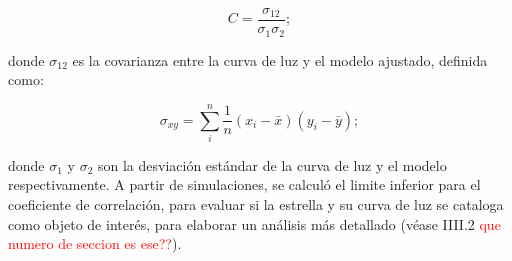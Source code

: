 \begin{equation}
\displaystyle C=\frac{\sigma_{12}}{\sigma_{1}\sigma_{2}};
\end{equation}
  
donde $\sigma_{12}$ es la covarianza entre la curva de luz y el modelo ajustado, definida como:
  
\begin{equation}
\displaystyle \sigma_{xy}= \sum\limits_{i}^{n} \frac{1}{n}(x_{i}-\bar{x})(y_{i}-\bar{y});
\end{equation}
  
donde $\sigma_{1}$ y $\sigma_{2}$ son la desviación estándar de la curva de luz y el modelo respectivamente. A partir de simulaciones, se calculó el limite inferior para el coeficiente de correlación, para evaluar si la estrella y su curva de luz se cataloga como objeto de interés, para elaborar un análisis más detallado (véase IIII.2 \textcolor{red}{que numero de seccion es ese??}).